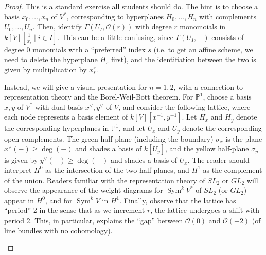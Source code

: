 \documentclass[10pt]{article}
\theoremstyle{definition}
\DeclareMathOperator{\Sym}{Sym}
\newcommand{\PP}{\mathbb{P}}
\newcommand{\OO}{\mathcal{O}}
\begin{document}
\begin{proof}
This is a standard exercise all students should do.  The hint is to choose a basis $x_0, \ldots, x_n$ of $V^*$, corresponding to hyperplanes $H_0, \ldots, H_n$ with complements $U_0, \ldots, U_n$.  Then, identify $\Gamma(U_I, \OO(r))$ with degree $r$ monomoials in $k[V][\frac{1}{x_i} \mid i \in I]$.  This can be a little confusing, since $\Gamma(U_I, -)$ consists of degree 0 monomials with a ``preferred'' index $s$ (i.e. to get an affine scheme, we need to delete the hyperplane $H_s$ first), and the identifiation between the two is given by multiplication by $x_s^r$.





Instead, we will give a visual presentation for $n=1, 2$, with a connection to representation theory and the Borel-Weil-Bott theorem.  For $\PP^1$, choose a basis $x, y$ of $V^*$ with dual basis $x^\vee, y^\vee$ of $V$, and consider the following lattice, where each node represents a basis element of $k[V][x^{-1}, y^{-1}]$.  Let $H_x$ and $H_y$ denote the corresponding hyperplanes in $\PP^1$, and let $U_x$ and $U_y$ denote the corresponding open complements.  The green half-plane (including the boundary) $\sigma_x$ is the plane $x^\vee(-) \geq \deg(-)$ and shades a basis of $k[U_y]$, and the yellow half-plane $\sigma_y$ is given by $y^\vee(-) \geq \deg(-)$ and shades a basis of $U_x$.  The reader should interpret $H^0$ as the intersection of the two half-planes, and $H^1$ as the complement of the union.  Readers familiar with the representation theory of $SL_2$ or $GL_2$ will observe the appearance of the weight diagrams for $\Sym^k V^*$ of $SL_2$ (or $GL_2$) appear in $H^0$, and for $\Sym^k V$ in $H^1$.  Finally, observe that the lattice has ``period'' 2 in the sense that as we increment $r$, the lattice undergoes a shift with period 2.  This, in particular, explains the ``gap'' between $\OO(0)$ and $\OO(-2)$ (of line bundles with no cohomology).
\begin{center}
  \begin{tikzpicture}


\end{tikzpicture}
\end{center}
\end{proof}
\end{document}
